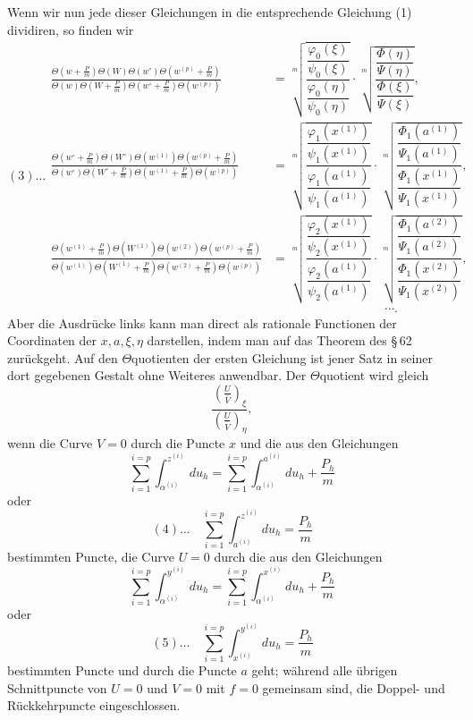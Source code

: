 \documentclass[10pt]{article}
\begin{document}
Wenn wir nun jede dieser Gleichungen in die entsprechende Gleichung (1) dividiren, so finden wir
\[
(3)\ldots
\begin{aligned}
\frac{\Theta\left(w+\frac Pm\right)\Theta(W)\Theta(w^\circ)\Theta\left(w^{(p)}+\frac Pm\right)}
{\Theta(w)\Theta\left(W+\frac Pm\right)\Theta\left(w^\circ+\frac Pm\right)\Theta(w^{(p)})}
&=
\sqrt[m]{\dfrac{\dfrac{\varphi_0(\xi)}{\psi_0(\xi)}}{\dfrac{\varphi_0(\eta)}{\psi_0(\eta)}}}
\cdot
\sqrt[m]{\dfrac{\dfrac{\Phi(\eta)}{\Psi(\eta)}}{\dfrac{\Phi(\xi)}{\Psi(\xi)}}},\\[0.7em]
\frac{\Theta\left(w^\circ+\frac Pm\right)\Theta(W^\circ)\Theta(w^{(1)})\Theta\left(w^{(p)}+\frac Pm\right)}
{\Theta(w^\circ)\Theta\left(W^\circ+\frac Pm\right)\Theta\left(w^{(1)}+\frac Pm\right)\Theta(w^{(p)})}
&=
\sqrt[m]{\dfrac{\dfrac{\varphi_1(x^{(1)})}{\psi_1(x^{(1)})}}{\dfrac{\varphi_1(a^{(1)})}{\psi_1(a^{(1)})}}}
\cdot
\sqrt[m]{\dfrac{\dfrac{\Phi_1(a^{(1)})}{\Psi_1(a^{(1)})}}{\dfrac{\Phi_1(x^{(1)})}{\Psi_1(x^{(1)})}}},\\[0.7em]
\frac{\Theta\left(w^{(1)}+\frac Pm\right)\Theta(W^{(1)})\Theta(w^{(2)})\Theta\left(w^{(p)}+\frac Pm\right)}
{\Theta(w^{(1)})\Theta\left(W^{(1)}+\frac Pm\right)\Theta\left(w^{(2)}+\frac Pm\right)\Theta(w^{(p)})}
&=
\sqrt[m]{\dfrac{\dfrac{\varphi_2(x^{(1)})}{\psi_2(x^{(1)})}}{\dfrac{\varphi_2(a^{(1)})}{\psi_2(a^{(1)})}}}
\cdot
\sqrt[m]{\dfrac{\dfrac{\Phi_1(a^{(2)})}{\Psi_1(a^{(2)})}}{\dfrac{\Phi_1(x^{(2)})}{\Psi_1(x^{(2)})}}},\\
&\hspace{9em}\cdots .
\end{aligned}
\]
Aber die Ausdrücke links kann man direct als rationale Functionen der Coordinaten der \(x,a,\xi,\eta\) darstellen, indem man auf das Theorem des \S\,62 zurückgeht. Auf den \(\Theta\)quotienten der ersten Gleichung ist jener Satz in seiner dort gegebenen Gestalt ohne Weiteres anwendbar. Der \(\Theta\)quotient wird gleich
\[
\frac{\left(\frac{U}{\overline V}\right)_\xi}{\left(\frac{U}{\overline V}\right)_\eta},
\]
wenn die Curve \(V=0\) durch die Puncte \(x\) und die aus den Gleichungen
\[
\sum_{i=1}^{i=p}\int_{\alpha^{(i)}}^{z^{(i)}}du_h
=
\sum_{i=1}^{i=p}\int_{\alpha^{(i)}}^{a^{(i)}}du_h+\frac{P_h}{m}
\]
oder
\[
(4)\ldots\quad
\sum_{i=1}^{i=p}\int_{a^{(i)}}^{z^{(i)}}du_h=\frac{P_h}{m}
\]
bestimmten Puncte, die Curve \(U=0\) durch die aus den Gleichungen
\[
\sum_{i=1}^{i=p}\int_{\alpha^{(i)}}^{y^{(i)}}du_h
=
\sum_{i=1}^{i=p}\int_{\alpha^{(i)}}^{x^{(i)}}du_h+\frac{P_h}{m}
\]
oder
\[
(5)\ldots\quad
\sum_{i=1}^{i=p}\int_{x^{(i)}}^{y^{(i)}}du_h=\frac{P_h}{m}
\]
bestimmten Puncte und durch die Puncte \(a\) geht; während alle übrigen Schnittpuncte von \(U=0\) und \(V=0\) mit \(f=0\) gemeinsam sind, die Doppel- und Rückkehrpuncte eingeschlossen.
\end{document}
